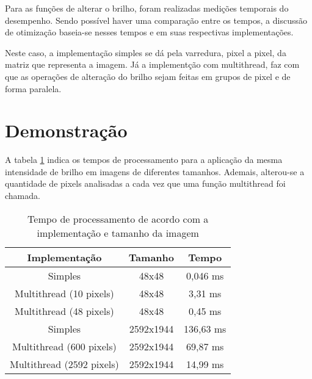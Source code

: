 \documentclass[a4paper, 10pt, conference]{ieeeconf}
\begin{document}
Para as funções de alterar o brilho, foram realizadas medições temporais do desempenho. Sendo possível haver uma comparação entre os tempos, a discussão de otimização baseia-se nesses tempos e em suas respectivas implementações.

Neste caso, a implementação simples se dá pela varredura, pixel a pixel, da matriz que representa a imagem. Já a implementção com multithread, faz com que as operações de alteração do brilho sejam feitas em grupos de pixel e de forma paralela.

\section{Demonstração}


A tabela \ref{tabela2} indica os tempos de processamento para a aplicação da mesma intensidade de brilho em imagens de diferentes tamanhos. Ademais, alterou-se a quantidade de pixels analisadas a cada vez que uma função multithread foi chamada.

\begin{table}[h]
	\centering
	\caption{Tempo de processamento de acordo com a implementação e tamanho da imagem}
	\label{tabela2}
	\begin{tabular}{|c|c|c|}
		\hline
		\textbf{Implementação}        & \textbf{Tamanho}                                                                                                               & \textbf{Tempo} \\ \hline
		Simples     & {48x48}	& {0,046 ms}                                                                                    \\ \hline
		Multithread (10 pixels)        & {48x48}	& {3,31 ms} \\ \hline
		Multithread (48 pixels)        & {48x48}	& {0,45 ms} \\ \hline
		Simples     & {2592x1944}	& {136,63 ms}                                                                                    \\ \hline
		Multithread (600 pixels)        & {2592x1944}	& {69,87 ms} \\ \hline
		Multithread (2592 pixels)        & {2592x1944}	& {14,99 ms} \\ \hline
		
	\end{tabular}
\end{table}
\end{document}
